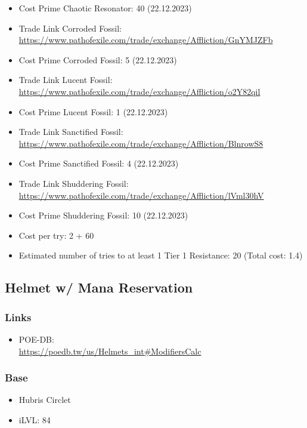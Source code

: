 \begin{enumerate}
\begin{enumerate}
\begin{itemize}
			\item Cost Prime Chaotic Resonator: \SI{40}{\Chaos} (22.12.2023)
			\item Trade Link Corroded Fossil: \url{https://www.pathofexile.com/trade/exchange/Affliction/GnYMJZFb}
			\item Cost Prime Corroded Fossil: \SI{5}{\Chaos} (22.12.2023)
			\item Trade Link Lucent Fossil: \url{https://www.pathofexile.com/trade/exchange/Affliction/o2Y82qil}
			\item Cost Prime Lucent Fossil: \SI{1}{\Chaos} (22.12.2023)
			\item Trade Link Sanctified Fossil: \url{https://www.pathofexile.com/trade/exchange/Affliction/BlnrowS8}
			\item Cost Prime Sanctified Fossil: \SI{4}{\Chaos} (22.12.2023)
			\item Trade Link Shuddering Fossil: \url{https://www.pathofexile.com/trade/exchange/Affliction/lVml30hV}
			\item Cost Prime Shuddering Fossil: \SI{10}{\Chaos} (22.12.2023)
		\end{itemize}
	\end{enumerate}
	\begin{itemize}
		\item Cost per try: \SI{2}{\Divine} + \SI{60}{\Chaos}
		\item Estimated number of tries to at least 1 Tier 1 Resistance: 20 (Total cost: \SI{1.4}{\Divine})
	\end{itemize}
\end{enumerate}

\subsection{Helmet w/ Mana Reservation}
\subsubsection{Links}
\begin{itemize}
	\item POE-DB:\\
	\url{https://poedb.tw/us/Helmets_int#ModifiersCalc}
\end{itemize}

\subsubsection{Base}
\begin{itemize}
	\item Hubris Circlet
	\item iLVL: 84
\end{itemize}

